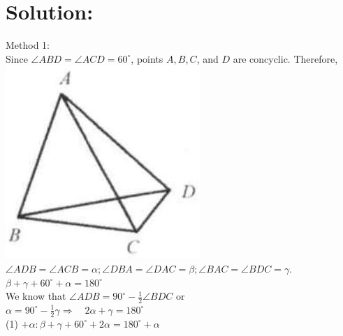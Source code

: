 \documentclass[10pt]{article}
\begin{document}
\section*{Solution:}
Method 1:\\
Since \(\angle A B D=\angle A C D=60^{\circ}\), points \(A, B, C\), and \(D\) are concyclic. Therefore,\\
\includegraphics[max width=\textwidth, center]{2025_04_17_97bc1f7e44d93c271a88g-196(2)}\\
\(\angle A D B=\angle A C B=\alpha ; \angle D B A=\angle D A C=\beta ; \angle B A C=\angle B D C=\gamma\).\\
\(\beta+\gamma+60^{\circ}+\alpha=180^{\circ}\)\\
We know that \(\angle A D B=90^{\circ}-\frac{1}{2} \angle B D C\) or\\
\(\alpha=90^{\circ}-\frac{1}{2} \gamma \Rightarrow \quad 2 \alpha+\gamma=180^{\circ}\)\\
(1) \(+\alpha: \beta+\gamma+60^{\circ}+2 \alpha=180^{\circ}+\alpha\)\\
\end{document}

